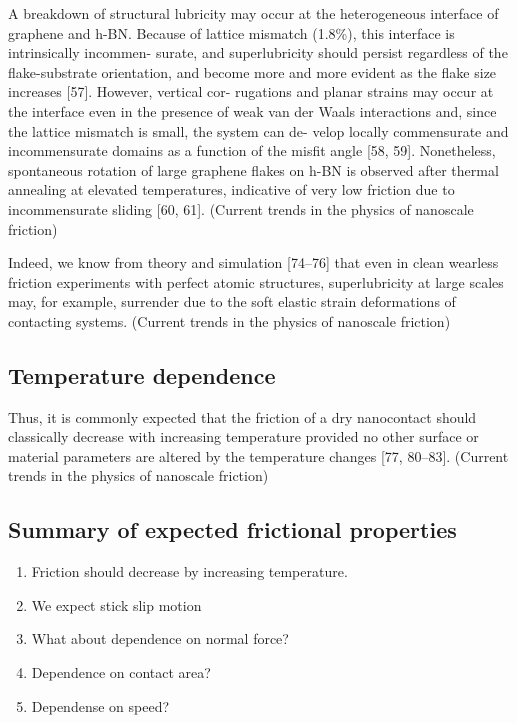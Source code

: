 A breakdown of structural lubricity may occur at the heterogeneous interface of graphene and h-BN. Because of lattice mismatch (1.8\%), this interface is intrinsically incommen- surate, and superlubricity should persist regardless of the flake-substrate orientation, and become more and more evident as the flake size increases [57]. However, vertical cor- rugations and planar strains may occur at the interface even in the presence of weak van der Waals interactions and, since the lattice mismatch is small, the system can de- velop locally commensurate and incommensurate domains as a function of the misfit angle [58, 59]. Nonetheless, spontaneous rotation of large graphene flakes on h-BN is observed after thermal annealing at elevated temperatures, indicative of very low friction due to incommensurate sliding [60, 61]. (Current trends in the physics of nanoscale friction)

Indeed, we know from theory and simulation [74–76] that even in clean wearless friction experiments with perfect atomic structures, superlubricity at large scales may, for example, surrender due to the soft elastic strain deformations of contacting systems. (Current trends in the physics of nanoscale friction)




\subsection{Temperature dependence}
Thus, it is commonly expected that the friction of a dry nanocontact should classically decrease with increasing temperature provided no other surface or material parameters are altered by the temperature changes [77, 80–83]. (Current trends in the physics of nanoscale friction)


\subsection{Summary of expected frictional properties}
\begin{enumerate}
  \item Friction should decrease by increasing temperature.
  \item We expect stick slip motion
  \item What about dependence on normal force?
  \item Dependence on contact area?
  \item Dependense on speed? 
\end{enumerate}


